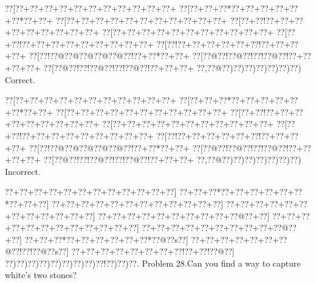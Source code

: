 \documentclass[a5paper]{article}
\begin{document}
\begin{center}
{\goo
\0??[\0??+\0??+\0??+\0??+\0??+\0??+\0??+\0??+\0??+\0??+\0??+
\0??[\0??+\0??+\0??*\0??+\0??+\0??+\0??+\0??+\0??*\0??+\0??+
\0??[\0??+\0??+\0??+\0??+\0??+\0??+\0??+\0??+\0??+\0??+\0??+
\0??[\0??+\0??!\0??+\0??+\0??+\0??+\0??+\0??+\0??+\0??+\0??+
\0??[\0??+\0??+\0??+\0??+\0??+\0??+\0??+\0??+\0??+\0??+\0??+
\0??[\0??+\0??!\0??+\0??+\0??+\0??+\0??+\0??+\0??+\0??+\0??+
\0??[\0??!\0??+\0??+\0??+\0??+\0??+\0??!\0??+\0??+\0??+\0??+
\0??[\0??!\0??@\0??@\0??@\0??@\0??@\0??!\0??+\0??*\0??+\0??+
\0??[\0??@\0??!\0??@\0??!\0??!\0??@\0??!\0??+\0??+\0??+\0??+
\0??[\0??@\0??!\0??!\0??@\0??!\0??!\0??@\0??!\0??+\0??+\0??+
\0??,\0??@\0??)\0??)\0??)\0??)\0??)\0??)\0??)
}
Correct. 

\end{center}
\begin{center}
{\goo
\0??[\0??+\0??+\0??+\0??+\0??+\0??+\0??+\0??+\0??+\0??+\0??+
\0??[\0??+\0??+\0??*\0??+\0??+\0??+\0??+\0??+\0??*\0??+\0??+
\0??[\0??+\0??+\0??+\0??+\0??+\0??+\0??+\0??+\0??+\0??+\0??+
\0??[\0??+\0??!\0??+\0??+\0??+\0??+\0??+\0??+\0??+\0??+\0??+
\0??[\0??+\0??+\0??+\0??+\0??+\0??+\0??+\0??+\0??+\0??+\0??+
\0??[\0??+\0??!\0??+\0??+\0??+\0??+\0??+\0??+\0??+\0??+\0??+
\0??[\0??!\0??+\0??+\0??+\0??+\0??+\0??!\0??+\0??+\0??+\0??+
\0??[\0??!\0??@\0??@\0??@\0??@\0??@\0??!\0??+\0??*\0??+\0??+
\0??[\0??@\0??!\0??@\0??!\0??!\0??@\0??!\0??+\0??+\0??+\0??+
\0??[\0??@\0??!\0??!\0??@\0??!\0??!\0??@\0??!\0??+\0??+\0??+
\0??,\0??@\0??)\0??)\0??)\0??)\0??)\0??)\0??)
}
Incorrect. 

\end{center}
\newpage
\begin{center}
{\goo
\0??+\0??+\0??+\0??+\0??+\0??+\0??+\0??+\0??+\0??+\0??+\0??]
\0??+\0??+\0??*\0??+\0??+\0??+\0??+\0??+\0??*\0??+\0??+\0??]
\0??+\0??+\0??+\0??+\0??+\0??+\0??+\0??+\0??+\0??+\0??+\0??]
\0??+\0??+\0??+\0??+\0??+\0??+\0??+\0??+\0??+\0??+\0??+\0??]
\0??+\0??+\0??+\0??+\0??+\0??+\0??+\0??+\0??+\0??@\0??+\0??]
\0??+\0??+\0??+\0??+\0??+\0??+\0??+\0??+\0??+\0??+\0??+\0??]
\0??+\0??+\0??+\0??+\0??+\0??+\0??+\0??+\0??+\0??@\0??+\0??]
\0??+\0??+\0??*\0??+\0??+\0??+\0??+\0??+\0??*\0??@\0??s\0??]
\0??+\0??+\0??+\0??+\0??+\0??+\0??@\0??!\0??!\0??@\0??s\0??]
\0??+\0??+\0??+\0??+\0??+\0??+\0??+\0??!\0??+\0??!\0??@\0??]
\0??)\0??)\0??)\0??)\0??)\0??)\0??)\0??)\0??!\0??)\0??)\0??.
}
Problem 28.Can you find a way to capture white's two stones?

\end{center}
\end{document}
